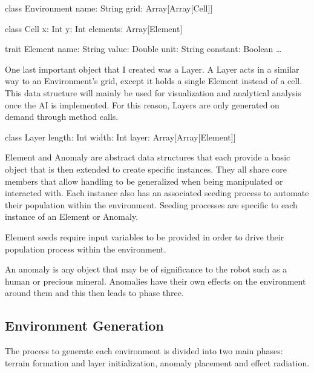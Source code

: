 class Environment {
	name: String
	grid: Array[Array[Cell]]
}

class Cell {
	x: Int
y: Int
	elements: Array[Element]
}

trait Element {
name: String
	value: Double
	unit: String
	constant: Boolean
	…
}

One last important object that I created was a Layer.
A Layer acts in a similar way to an Environment’s grid, except it holds a single Element instead of a cell.
This data structure will mainly be used for visualization and analytical analysis once the AI is implemented.
For this reason, Layers are only generated on demand through method calls.

class Layer {
	length: Int
	width: Int
	layer: Array[Array[Element]]
}

Element and Anomaly are abstract data structures that each provide a basic object that is then extended to create specific instances.
They all share core members that allow handling to be generalized when being manipulated or interacted with.
Each instance also has an associated seeding process to automate their population within the environment.
Seeding processes are specific to each instance of an Element or Anomaly.

Element seeds require input variables to be provided in order to drive their population process within the environment.

An anomaly is any object that may be of significance to the robot such as a human or precious mineral.
Anomalies have their own effects on the environment around them and this then leads to phase three.

\subsection{Environment Generation}
The process to generate each environment is divided into two main phases: terrain formation and layer initialization, anomaly placement and effect radiation.

